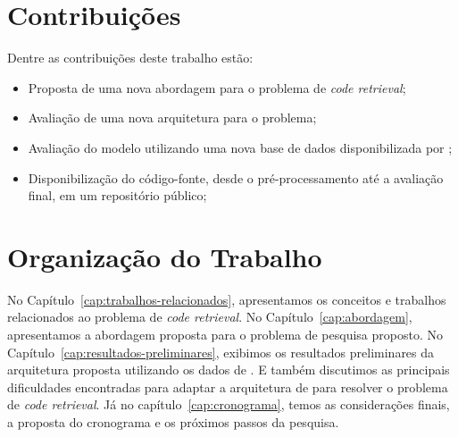 \section{Contribuições}
\label{sec:contribucoes}

Dentre as contribuições deste trabalho estão:

\begin{itemize}
\item Proposta de uma nova abordagem para o problema de \textit{code retrieval};
\item Avaliação de uma nova arquitetura para o problema;
\item Avaliação do modelo utilizando uma nova base de dados disponibilizada por \cite{yao-2018};
\item Disponibilização do código-fonte, desde o pré-processamento até a avaliação final, em um repositório público;
\end{itemize}

\section{Organização do Trabalho}
\label{sec:organizacao_trabalho}

No Capítulo~\ref{cap:trabalhos-relacionados}, apresentamos os conceitos e trabalhos relacionados ao problema de \textit{code retrieval}. No Capítulo~\ref{cap:abordagem}, apresentamos a abordagem proposta para o problema de pesquisa proposto. No Capítulo~\ref{cap:resultados-preliminares}, exibimos os resultados preliminares da arquitetura proposta utilizando os dados de \cite{yao-2018}. E também discutimos as principais dificuldades encontradas para adaptar a arquitetura de \cite{tan-lstm-qa} para resolver o problema de \textit{code retrieval}. Já no capítulo~\ref{cap:cronograma}, temos as considerações finais, a proposta do cronograma e os próximos passos da pesquisa.